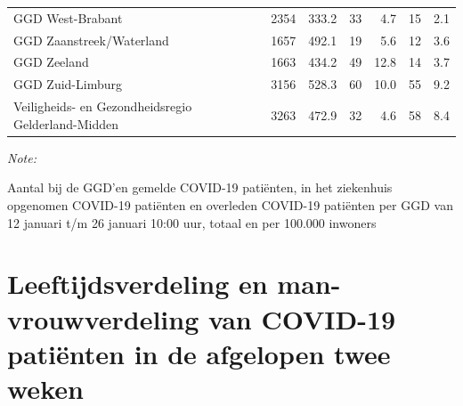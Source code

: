 \documentclass[
  english,
  man,floatsintext]{apa6}
\begin{document}
\begin{table}[H]
\begin{threeparttable}
\begin{tabular}{lrrrrrr}
GGD West-Brabant & 2354 & 333.2 & 33 & 4.7 & 15 & 2.1\\
GGD Zaanstreek/Waterland & 1657 & 492.1 & 19 & 5.6 & 12 & 3.6\\
GGD Zeeland & 1663 & 434.2 & 49 & 12.8 & 14 & 3.7\\
GGD Zuid-Limburg & 3156 & 528.3 & 60 & 10.0 & 55 & 9.2\\
Veiligheids- en Gezondheidsregio Gelderland-Midden & 3263 & 472.9 & 32 & 4.6 & 58 & 8.4\\
\bottomrule
\end{tabular}
\begin{tablenotes}
\item \textit{Note: } 
\item Aantal bij de GGD’en gemelde COVID-19 patiënten, in het ziekenhuis opgenomen COVID-19 patiënten en overleden COVID-19 patiënten per GGD van 12 januari t/m 26 januari 10:00 uur, totaal en per 100.000 inwoners
\end{tablenotes}
\end{threeparttable}
\endgroup{}
\end{table}

\newpage

\hypertarget{leeftijdsverdeling-en-man-vrouwverdeling-van-covid-19-patiuxebnten-in-de-afgelopen-twee-weken}{%
\section{Leeftijdsverdeling en man-vrouwverdeling van COVID-19 patiënten in de afgelopen twee weken}\label{leeftijdsverdeling-en-man-vrouwverdeling-van-covid-19-patiuxebnten-in-de-afgelopen-twee-weken}}
\end{document}
